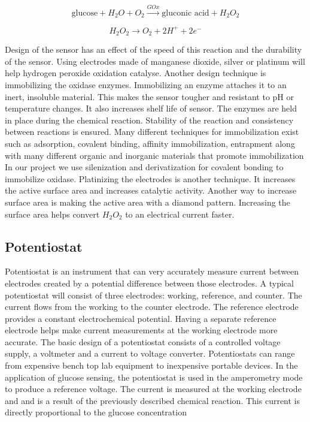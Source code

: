 \begin{equation} \label{eq:glux}
\text{glucose} + H_2O + O_2 \xrightarrow{GOx}  \text{gluconic acid} + H_2O_2
\end{equation}

\begin{equation} \label{eq:perox}
H_2O_2 \rightarrow O_2 + 2H^+ + 2e^-
\end{equation}

Design of the sensor has an effect of the speed of this reaction and the durability of the sensor. Using electrodes made of manganese dioxide, silver or platinum will help hydrogen peroxide oxidation catalyse. \cite{Raba:1995}
Another design technique is immobilizing the oxidase enzymes. Immobilizing an enzyme attaches it to an inert, insoluble material. This makes the sensor tougher and resistant to pH or temperature changes. It also increases shelf life of sensor. The enzymes are held in place during the chemical reaction. Stability of the reaction and consistency between reactions is ensured. Many different techniques for immobilization exist such as adsorption, covalent binding, affinity immobilization, entrapment along with many different organic and inorganic materials that promote immobilization \cite{Datta:2013} In our project we use silenization and derivatization for covalent bonding to immobilize oxidase. \cite{Urban:1991} Platinizing the electrodes is another technique. It increases the active surface area and increases catalytic activity. Another way to increase surface area is making the active area with a diamond pattern. Increasing the surface area helps convert $ H_{2}O_{2}$ to an electrical current faster. \cite{Zhang:1996}

\subsection{Potentiostat}
Potentiostat is an instrument that can very accurately measure current between electrodes created by a potential difference between those electrodes. A typical potentiostat will consist of three electrodes: working, reference, and counter. The current flows from the working to the counter electrode. The reference electrode provides a constant electrochemical potential. Having a separate reference electrode helps make current measurements at the working electrode more accurate. The basic design of a potentiostat consists of a controlled voltage supply, a voltmeter and a current to voltage converter. \cite{Penn:2010} Potentiostats can range from expensive bench top lab equipment to inexpensive portable devices. \cite{Row:2011}\cite{Gopinath:2006} In the application of glucose sensing, the potentiostat is used in the amperometry mode to produce a reference voltage. The current is measured at the working electrode and and is a result of the previously described chemical reaction.  This current is directly proportional to the glucose concentration

